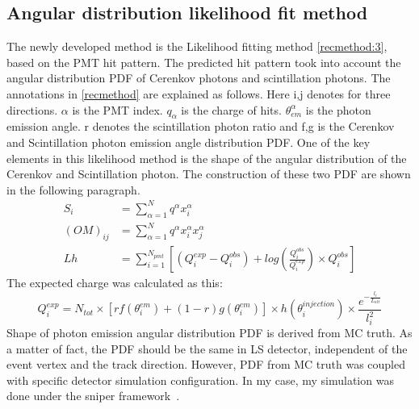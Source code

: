 \documentclass[a4paper,10pt]{cpc-hepnp}
\begin{document}
\subsection{Angular distribution likelihood fit method}
The newly developed method is the Likelihood fitting
method \eqref{recmethod:3}, based on the PMT hit pattern. The predicted hit
pattern took into account the angular distribution PDF of Cerenkov
photons and scintillation photons. The annotations in \eqref{recmethod} are
explained as follows.
Here i,j denotes for three directions. $\alpha$ is the PMT index. $q_{\alpha}$ is the
charge of hits. $\theta_{em}^{\alpha}$  is the photon emission angle. r denotes
the scintillation photon ratio and f,g is the Cerenkov and Scintillation photon
emission angle distribution PDF. 
One of the key elements in this
likelihood method is the shape of the angular distribution of the Cerenkov
and Scintillation photon. The construction of these two PDF are shown in the
following paragraph.
\begin{subequations}\label{recmethod}
\begin{align}
\label{recmethod:1}
S_{i} & = \sum_{\alpha=1}^{N}q^{\alpha}x_{i}^{\alpha}
\\
\label{recmethod:2}
(OM)_{ij} & = \sum_{\alpha=1}^{N}q^{\alpha}x_{i}^{\alpha}x_{j}^{\alpha}
\\
\label{recmethod:3}
Lh &= \sum_{i=1}^{N_{pmt}}[(Q^{exp}_{i}-Q^{obs}_{i})+log(\frac{Q^{obs}_{i}}{Q^{exp}_{i}}){\times}Q^{obs}_{i}]
\end{align}
\end{subequations}
The expected charge was calculated as this:
\begin{equation*}
Q^{exp}_{i} = N_{tot}\times[rf(\theta^{em}_{i})+(1-r)g(\theta^{em}_{i})]{\times}h(\theta^{injection}_{i})\times\frac{e^{-\frac{l_i}{L_{att}}}}{l_i^2}
\end{equation*}
Shape of photon emission angular distribution PDF is derived from MC truth.
As a matter of fact, the PDF should be the same in LS detector, independent
of the event vertex and the track direction. However, PDF from MC truth was
coupled with specific detector simulation configuration. In my case, my
simulation was done under the sniper framework~\cite{sniper}.
\end{document}
